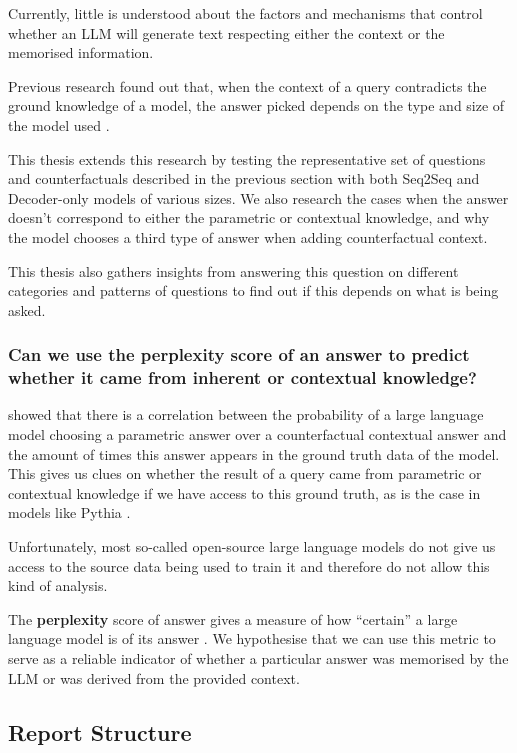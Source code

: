 Currently, little is understood about the factors and mechanisms that control whether an LLM will generate text respecting either the context or the memorised information.

Previous research found out that, when the context of a query contradicts the ground knowledge of a model, the answer picked depends on the type and size of the model used \citep{factual_recall}.

This thesis extends this research by testing the representative set of questions and counterfactuals described in the previous section with both Seq2Seq and Decoder-only models of various sizes.
We also research the cases when the answer doesn't correspond to either the parametric or contextual knowledge, and why the model chooses a third type of answer when adding counterfactual context.

This thesis also gathers insights from answering this question on different categories and patterns of questions to find out if this depends on what is being asked.

\subsubsection{Can we use the perplexity score of an answer to predict whether it came from inherent or contextual knowledge?}

 showed that there is a correlation between the probability of a large language model choosing a parametric answer over a counterfactual contextual answer and the amount of times this answer appears in the ground truth data of the model.
This gives us clues on whether the result of a query came from parametric or contextual knowledge if we have access to this ground truth, as is the case in models like Pythia \citep{pythia}.

Unfortunately, most so-called open-source large language models do not give us access to the source data being used to train it and therefore do not allow this kind of analysis.

The \textbf{perplexity} score of answer gives a measure of how ``certain'' a large language model is of its answer \citep{how_can_we_know}.
We hypothesise that we can use this metric to serve as a reliable indicator of whether a particular answer was memorised by the LLM or was derived from the provided context.

\subsection{Report Structure}
